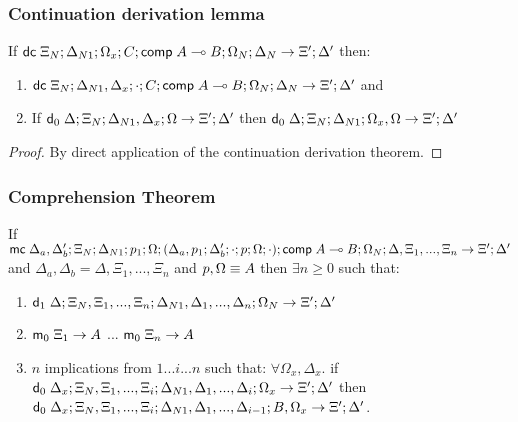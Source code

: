 \subsubsection{Continuation derivation lemma}

If $\mathsf{dc} \; \Xi_N; \Delta_{N1}; \Omega_x; C; \mathsf{comp} \; A \multimap B; \Omega_N; \Delta_N \rightarrow \Xi'; \Delta'$ then:
\begin{enumerate}
   \item $\mathsf{dc} \; \Xi_N; \Delta_{N1}, \Delta_x; \cdot; C; \mathsf{comp} \; A \multimap B; \Omega_N; \Delta_N \rightarrow \Xi'; \Delta'$ and
   \item If $\mathsf{d}_0 \; \Delta; \Xi_N; \Delta_{N1}, \Delta_x; \Omega \rightarrow \Xi'; \Delta'$ then $\mathsf{d}_0 \; \Delta; \Xi_N; \Delta_{N1}; \Omega_x, \Omega \rightarrow \Xi'; \Delta'$
\end{enumerate}

\begin{proof}
   By direct application of the continuation derivation theorem.
\end{proof}

\subsubsection{Comprehension Theorem}

If $\mathsf{mc} \; \Delta_a, \Delta'_b; \Xi_N; \Delta_{N1}; p_1; \Omega; (\Delta_a, p_1; \Delta'_b; \cdot; p; \Omega; \cdot); \mathsf{comp} \; A \multimap B; \Omega_N; \Delta, \Xi_1, ..., \Xi_n \rightarrow \Xi'; \Delta'$ and $\Delta_a, \Delta_b = \Delta, \Xi_1, ..., \Xi_n$ and $p, \Omega \equiv A$ then $\exists n \geq 0$ such that:
\begin{enumerate}
   \item $\mathsf{d}_1 \; \Delta; \Xi_N, \Xi_1, ..., \Xi_n; \Delta_{N1}, \Delta_1, ..., \Delta_n; \Omega_N \rightarrow \Xi'; \Delta'$
   \item $\mathsf{m}_0 \; \Xi_1 \rightarrow A$ ... $\mathsf{m}_0 \; \Xi_n \rightarrow A$
   \item $n$ implications from $1 ... i ... n$ such that: $\forall \Omega_x, \Delta_x.$ if $\mathsf{d}_0 \; \Delta_x; \Xi_N, \Xi_1, ..., \Xi_i; \Delta_{N1}, \Delta_1, ..., \Delta_i; \Omega_x \rightarrow \Xi'; \Delta'$ then $\mathsf{d}_0 \; \Delta_x; \Xi_N, \Xi_1, ..., \Xi_i; \Delta_{N1}, \Delta_1, ..., \Delta_{i-1}; B, \Omega_x \rightarrow \Xi'; \Delta'$.
\end{enumerate}

